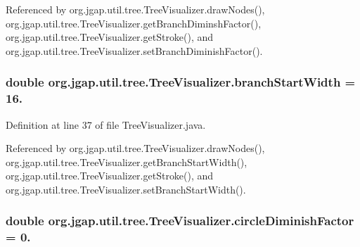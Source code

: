 Referenced by org.\-jgap.\-util.\-tree.\-Tree\-Visualizer.\-draw\-Nodes(), org.\-jgap.\-util.\-tree.\-Tree\-Visualizer.\-get\-Branch\-Diminsh\-Factor(), org.\-jgap.\-util.\-tree.\-Tree\-Visualizer.\-get\-Stroke(), and org.\-jgap.\-util.\-tree.\-Tree\-Visualizer.\-set\-Branch\-Diminish\-Factor().

\hypertarget{classorg_1_1jgap_1_1util_1_1tree_1_1_tree_visualizer_a4ddc046f06eb478f9fdf02ece6177acd}{
\subsubsection[{branch\-Start\-Width}]{\setlength{\rightskip}{0pt plus 5cm}double org.\-jgap.\-util.\-tree.\-Tree\-Visualizer.\-branch\-Start\-Width = 16.\hspace{0.3cm}{\ttfamily [private]}}}\label{classorg_1_1jgap_1_1util_1_1tree_1_1_tree_visualizer_a4ddc046f06eb478f9fdf02ece6177acd}


Definition at line 37 of file Tree\-Visualizer.\-java.



Referenced by org.\-jgap.\-util.\-tree.\-Tree\-Visualizer.\-draw\-Nodes(), org.\-jgap.\-util.\-tree.\-Tree\-Visualizer.\-get\-Branch\-Start\-Width(), org.\-jgap.\-util.\-tree.\-Tree\-Visualizer.\-get\-Stroke(), and org.\-jgap.\-util.\-tree.\-Tree\-Visualizer.\-set\-Branch\-Start\-Width().

\hypertarget{classorg_1_1jgap_1_1util_1_1tree_1_1_tree_visualizer_a3ff42c595d610aaa23f2102a0a590930}{
\subsubsection[{circle\-Diminish\-Factor}]{\setlength{\rightskip}{0pt plus 5cm}double org.\-jgap.\-util.\-tree.\-Tree\-Visualizer.\-circle\-Diminish\-Factor = 0.\hspace{0.3cm}{\ttfamily [private]}}}\label{classorg_1_1jgap_1_1util_1_1tree_1_1_tree_visualizer_a3ff42c595d610aaa23f2102a0a590930}


